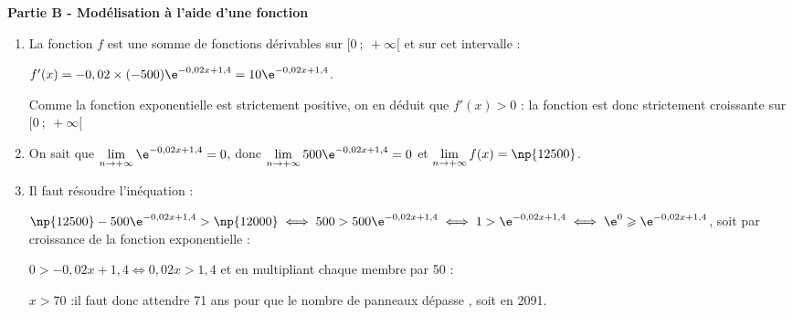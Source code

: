 \bigskip

\textbf{Partie B - Modélisation à l'aide d'une fonction}







\medskip

\begin{enumerate}
\item 
La fonction $f$ est une somme de fonctions dérivables sur $[0~;~ +\infty[$ et sur cet intervalle :

$f'(x) = - 0,02 \times (- 500)\e^{-0,02x+1,4} = 10\e^{-0,02x+1,4}$.

Comme la fonction exponentielle est strictement positive, on en déduit que $f'(x) > 0$ : la fonction est donc strictement croissante sur $[0~;~ +\infty[$ 
\item 
On sait que $\displaystyle\lim_{n \to + \infty} \e^{-0,02x+1,4} = 0$, donc $\displaystyle\lim_{n \to + \infty} 500 \e^{-0,02x+1,4} = 0$ et $\displaystyle\lim_{n \to + \infty} f(x) = \np{12500}$.
\item 
Il faut résoudre l'inéquation :

$\np{12500} - 500 \e^{-0,02x+1,4} > \np{12000} \iff 500 > 500\e^{-0,02x+1,4} \iff 1 >\e^{-0,02x+1,4} \iff \e^0 \geqslant \e^{-0,02x+1,4}$, soit par croissance de la fonction exponentielle :

$0 > - 0,02x + 1,4 \iff 0,02x > 1,4$ et en multipliant chaque membre par 50 : 

$x > 70$ :il faut donc attendre 71 ans pour que le nombre de panneaux dépasse , soit en 2091.

\end{enumerate}

\bigskip
